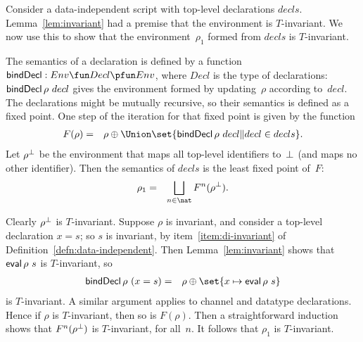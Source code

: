 


  
Consider a data-independent script with top-level declarations $decls$.
Lemma~\ref{lem:invariant} had a premise that the environment is $T$-invariant.
We now use this to show that the environment~$\rho_1$ formed from $decls$ is
$T$-invariant.

The semantics of a declaration is defined by a function $\bindDecl : Env \fun
Decl \pfun Env$, where $Decl$ is the type of declarations: $\mathop{\sf bindDecl}
\rho~decl$ gives the environment formed by updating~$\rho$ according to~$decl$. 
%
The declarations might be mutually recursive, so their semantics is defined as
a fixed point.  One step of the iteration for that fixed point is given by the
function
%
\begin{eqnarray*}
F(\rho) & = & \rho \oplus \Union \set{\bindDecl \rho ~ decl \| decl \in decls}.
\end{eqnarray*}
%
Let $\rho^\perp$ be the environment that maps all top-level identifiers
to~$\perp$ (and maps no other identifier).  Then the semantics of $decls$ is
the least fixed point of~$F$:
\begin{eqnarray*}
\rho_1 & = & \bigsqcup_{n \in \nat} F^n(\rho^\bottom).
\end{eqnarray*}

Clearly $\rho^\perp$ is $T$-invariant.  
%
Suppose $\rho$ is invariant, and consider a top-level declaration $x = s$;
so $s$ is invariant, by item~\ref{item:di-invariant} of
Definition~\ref{defn:data-independent}.  Then Lemma~\ref{lem:invariant} shows
that $\mathop{\sf eval} \rho~s$ is $T$-invariant, so 
\begin{eqnarray*}
\bindDecl \rho~(x = s) & = & \rho \oplus \set{x \mapsto \eval \rho~s}
\end{eqnarray*}
is $T$-invariant.  A similar argument applies to channel and datatype
declarations.  Hence if $\rho$ is $T$-invariant, then so is $F(\rho)$.
%
Then a straightforward induction shows that $F^n(\rho^\perp)$ is
$T$-invariant, for all~$n$.  It follows that $\rho_1$ is $T$-invariant.




